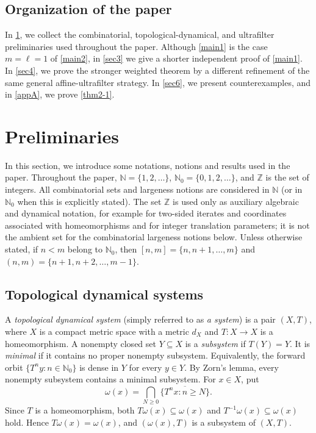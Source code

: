\documentclass[reqno,12pt]{amsart}
\newcommand{\Nzero}{\mathbb N_0}
\def \N {\mathbb N}
\def \Z {\mathbb Z}
\numberwithin{equation}{section}
\begin{document}
\subsection*{Organization of the paper}
In \cref{sec2}, we collect the combinatorial, topological-dynamical, and
ultrafilter preliminaries used throughout the paper. Although
\cref{main1} is the case $m=\ell=1$ of \cref{main2}, in \cref{sec3} we
give a shorter independent proof of \cref{main1}. In \cref{sec4}, we
prove the stronger weighted theorem by a different refinement of the same
general affine-ultrafilter strategy. In \cref{sec6}, we present
counterexamples, and in \cref{appA}, we prove \cref{thm2-1}.


\section{Preliminaries}\label{sec2}
In this section, we introduce some notations, notions and results used in the paper. Throughout the paper, $\N=\{1,2,\ldots\}$,
$\Nzero=\{0,1,2,\ldots\}$, and  $\Z$ is the set of integers.
All combinatorial sets and largeness notions are considered in $\N$ (or
in $\Nzero$ when this is explicitly stated). The set $\Z$ is used only
as auxiliary algebraic and dynamical notation, for example for two-sided
iterates and coordinates associated with homeomorphisms and for integer
translation parameters; it is not the ambient set for the combinatorial
largeness notions below. Unless otherwise stated, if $n<m$ belong to
$\Nzero$, then
$[n,m]=\{n,n+1,\ldots,m\}$ and
$(n,m)=\{n+1,n+2,\ldots,m-1\}$.

\subsection{Topological dynamical systems}
A {\em topological dynamical system} (simply referred to as \emph{a system}) is a pair $(X,T)$, where $X$ is a
compact metric space with a metric $d_X$ and $T:X\to X$ is a homeomorphism.  A nonempty closed set
$Y\subseteq X$ is a \emph{subsystem} if $T(Y)=Y$.  It is
\emph{minimal} if it contains no proper nonempty subsystem.  Equivalently,
the forward orbit $\{T^ny:n\in\Nzero\}$ is dense in $Y$ for every $y\in Y$.
By Zorn's lemma, every nonempty subsystem contains a minimal subsystem.
For $x\in X$, put
\begin{equation}\label{eq:omega-def}
\omega(x)=\bigcap_{N\geq0}
\overline{\{T^nx:n\geq N\}}.
\end{equation}
Since $T$ is a homeomorphism, both $T\omega(x)\subseteq\omega(x)$ and
$T^{-1}\omega(x)\subseteq\omega(x)$ hold. Hence
$T\omega(x)=\omega(x)$, and $(\omega(x),T)$ is a subsystem of $(X,T)$.
\end{document}
